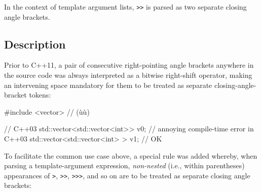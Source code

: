 
\setcounter{table}{0}
\setcounter{footnote}{0}
\setcounter{lstlisting}{0}


In the context of template argument lists, \lstinline!>>! is parsed as two
separate closing angle brackets.

\subsection[Description]{Description}\label{description}

Prior to C++11, a pair of consecutive right-pointing angle brackets anywhere in
the source code was always interpreted as a bitwise right-shift
operator, making an intervening space mandatory for them to be treated
as separate closing-angle-bracket tokens:

\begin{emcppshiddenlisting}[emcppsbatch=e1]
#include <vector>  // (ù{}ù)
\end{emcppshiddenlisting}
\begin{emcppslisting}[emcppsbatch=e1]
// C++03
std::vector<std::vector<int>> v0;   // annoying compile-time error in C++03
std::vector<std::vector<int> > v1;  // OK
\end{emcppslisting}

\noindent To facilitate the common use case above, a special rule was added
whereby, when parsing a template-argument expression, \emph{non-nested}
(i.e., within parentheses) appearances of \lstinline!>!, \lstinline!>>!,
\lstinline!>>>!, and so on are to be treated as separate closing angle brackets:

